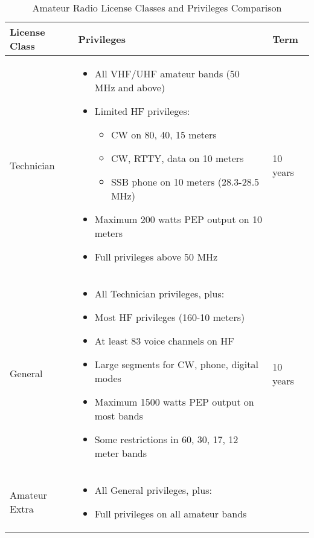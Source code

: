 \begin{table}[h!]
    \centering
    \caption{Amateur Radio License Classes and Privileges Comparison}
    \label{tab:license_classes}
    \begin{tabular}{|l|p{9cm}|l|}
        \hline
        \textbf{License Class} & \textbf{Privileges} & \textbf{Term} \\ 
        \hline
        Technician & 
        \begin{itemize}[noitemsep,topsep=0pt]
            \item All VHF/UHF amateur bands (50 MHz and above)
            \item Limited HF privileges:
                \begin{itemize}[noitemsep]
                    \item CW on 80, 40, 15 meters
                    \item CW, RTTY, data on 10 meters
                    \item SSB phone on 10 meters (28.3-28.5 MHz)
                \end{itemize}
            \item Maximum 200 watts PEP output on 10 meters
            \item Full privileges above 50 MHz
        \end{itemize} & 
        10 years \\ 
        \hline
        General & 
        \begin{itemize}[noitemsep,topsep=0pt]
            \item All Technician privileges, plus:
            \item Most HF privileges (160-10 meters)
            \item At least 83 voice channels on HF
            \item Large segments for CW, phone, digital modes
            \item Maximum 1500 watts PEP output on most bands
            \item Some restrictions in 60, 30, 17, 12 meter bands
        \end{itemize} & 
        10 years \\ 
        \hline
        Amateur Extra & 
        \begin{itemize}[noitemsep,topsep=0pt]
            \item All General privileges, plus:
            \item Full privileges on all amateur bands

\end{itemize}
\end{tabular}
\end{table}
